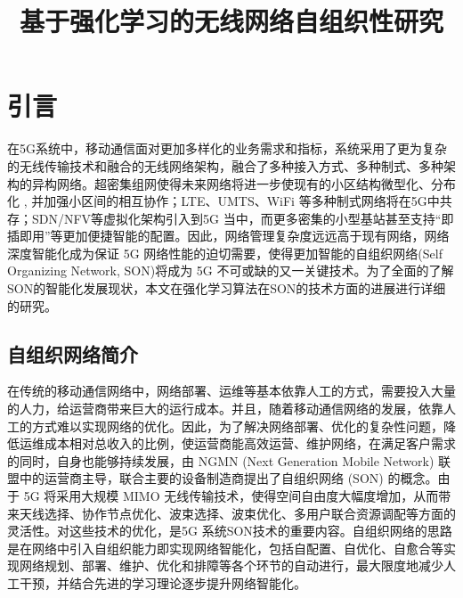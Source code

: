 ﻿\documentclass[11pt,draftclsnofoot,onecolumn,journal,letterpaper]{IEEEtran}
\begin{document}
\title{基于强化学习的无线网络自组织性研究}

\maketitle

%

\section{引言}
在5G系统中，移动通信面对更加多样化的业务需求和指标，系统采用了更为复杂的无线传输技术和融合的无线网络架构，融合了多种接入方式、多种制式、多种架构的异构网络。超密集组网使得未来网络将进一步使现有的小区结构微型化、分布化 , 并加强小区间的相互协作；LTE、UMTS、WiFi 等多种制式网络将在5G中共存；SDN/NFV等虚拟化架构引入到5G 当中，而更多密集的小型基站甚至支持“即插即用”等更加便捷智能的配置。因此，网络管理复杂度远远高于现有网络，网络深度智能化成为保证 5G 网络性能的迫切需要，使得更加智能的自组织网络(Self Organizing Network, SON)将成为 5G 不可或缺的又一关键技术。为了全面的了解SON的智能化发展现状，本文在强化学习算法在SON的技术方面的进展进行详细的研究。

\subsection{自组织网络简介}


在传统的移动通信网络中，网络部署、运维等基本依靠人工的方式，需要投入大量的人力，给运营商带来巨大的运行成本。并且，随着移动通信网络的发展，依靠人工的方式难以实现网络的优化。因此，为了解决网络部署、优化的复杂性问题，降低运维成本相对总收入的比例，使运营商能高效运营、维护网络，在满足客户需求的同时，自身也能够持续发展，由 NGMN (Next Generation Mobile Network) 联盟中的运营商主导，联合主要的设备制造商提出了自组织网络 (SON) 的概念\cite{Alliance2008}。由于 5G 将采用大规模 MIMO 无线传输技术，使得空间自由度大幅度增加，从而带来天线选择、协作节点优化、波束选择、波束优化、多用户联合资源调配等方面的灵活性。对这些技术的优化，是5G 系统SON技术的重要内容。自组织网络的思路是在网络中引入自组织能力即实现网络智能化，包括自配置、自优化、自愈合等实现网络规划、部署、维护、优化和排障等各个环节的自动进行，最大限度地减少人工干预，并结合先进的学习理论逐步提升网络智能化。
\end{document}
